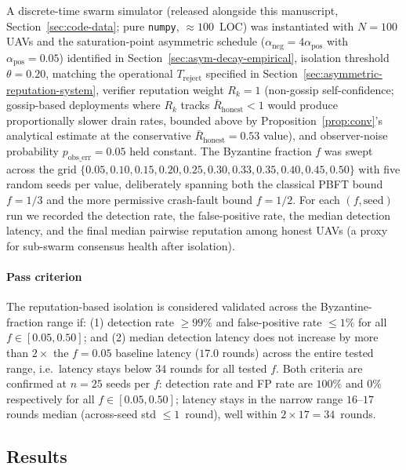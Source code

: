 \documentclass[journal,10pt,twocolumn]{IEEEtran}
\begin{document}
A discrete-time swarm simulator (released alongside this manuscript, Section~\ref{sec:code-data}; pure \texttt{numpy}, $\approx 100$~LOC)
was instantiated with $N{=}100$ UAVs and the saturation-point
asymmetric schedule ($\alpha_\text{neg} = 4 \alpha_\text{pos}$ with
$\alpha_\text{pos} = 0.05$) identified in
Section~\ref{sec:asym-decay-empirical}, isolation threshold
$\theta = 0.20$, matching the operational $T_\text{reject}$ specified
in Section~\ref{sec:asymmetric-reputation-system}, verifier reputation
weight $R_k = 1$ (non-gossip self-confidence; gossip-based deployments
where $R_k$ tracks $\bar{R}_\text{honest}<1$ would produce
proportionally slower drain rates, bounded above by Proposition~\ref{prop:conv}'s
analytical estimate at the conservative $\bar{R}_\text{honest}=0.53$ value), and observer-noise
probability $p_\text{obs\_err}=0.05$ held constant. The Byzantine
fraction $f$ was swept across the grid
$\{0.05, 0.10, 0.15, 0.20, 0.25, 0.30, 0.33, 0.35, 0.40, 0.45, 0.50\}$
with five random seeds per value, deliberately spanning both the
classical PBFT bound $f{=}1/3$ and the more permissive crash-fault
bound $f{=}1/2$. For each $(f, \text{seed})$ run we
recorded the detection rate, the false-positive rate, the median
detection latency, and the final median pairwise reputation among
honest UAVs (a proxy for sub-swarm consensus health after isolation).

\paragraph{Pass criterion}
The reputation-based isolation is considered validated across the Byzantine-fraction range if:
(1) detection rate $\geq 99\%$ and false-positive rate $\leq 1\%$ for all $f \in [0.05, 0.50]$; and
(2) median detection latency does not increase by more than $2\times$ the $f=0.05$ baseline latency ($17.0$ rounds) across the entire tested range, i.e.\ latency stays below $34$ rounds for all tested $f$.
Both criteria are confirmed at $n{=}25$ seeds per $f$: detection rate and FP rate are $100\%$ and $0\%$ respectively for all $f \in [0.05, 0.50]$; latency stays in the narrow range $16$--$17$ rounds median (across-seed std $\leq 1$~round), well within $2\times 17 = 34$~rounds.

\subsection{Results}
\end{document}
